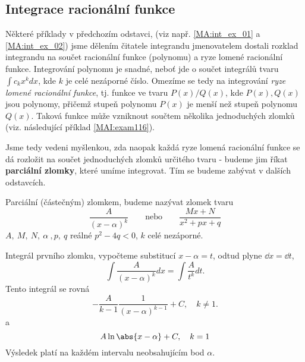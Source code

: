     \newpage
    \subsection{Integrace racionální funkce}
      Některé příklady v předchozím odstavci, (viz např. \ref{MA:int_ex_01} a 
      \ref{MA:int_ex_02}) jsme dělením čitatele integrandu jmenovatelem dostali rozklad
      integrandu na součet racionální funkce (polynomu) a ryze lomené racionální funkce.
      Integrování polynomu je snadné, neboť jde o součet integrálů tvaru $\int c_kx^k dx$, kde
      $k$ je celé nezáporné číslo. Omezíme se tedy na integrování \emph{ryze lomené racionální
      funkce},  tj. funkce ve tvaru $P(x)/Q(x)$, kde $P(x), Q(x)$ jsou polynomy, přičemž stupeň
      polynomu $P(x)$ je menší než stupeň polynomu $Q(x)$. Taková funkce může vzniknout součtem
      několika jednoduchých zlomků (viz. následující příklad \ref{MAI:exam116}).
      
      
      
      Jsme tedy vedeni myšlenkou, zda naopak každá ryze lomená racionální funkce se dá rozložit
      na součet jednoduchých zlomků určitého tvaru - budeme jim říkat \textbf{parciální zlomky},
      které umíme integrovat. Tím se budeme zabývat v dalších odstavcích. 
    
      
      
      \begin{mdframed}[style=mdmathdef] 
        \begin{definition} Parciální (částečným) zlomkem, budeme nazývat zlomek tvaru
          \begin{equation}
              \frac{A}{(x-\alpha)^k} \qquad\text{nebo}\qquad\frac{Mx + N}{x^2 + px +q}
          \end{equation}  
          $A,\ M,\ N,\ \alpha\ , p,\ q$ reálné $p^2-4q < 0$, $k$ celé nezáporné.         
        \end{definition}
      \end{mdframed}    
      
      Integrál prvního zlomku, vypočteme substitucí $x-\alpha=t$, odtud plyne \(\dd{x} = \dd{t}\),
      \begin{equation}\label{MA:int_ex_14}
        \boxed{\int\frac{A}{(x-\alpha)^k}dx = \int\frac{A}{t^k}dt.}
      \end{equation}
      Tento integrál se rovná
      \begin{equation}\label{MA:int_ex_16}
        -\frac{A}{k-1}\frac{1}{(x-\alpha)^{k-1}} + C, \quad k\neq1.
      \end{equation}  
      a 
      \begin{equation}
        A\ln\abs{x-\alpha} + C, \quad k = 1
      \end{equation}      
      Výsledek platí na každém intervalu neobsahujícím bod \(\alpha\).
      
